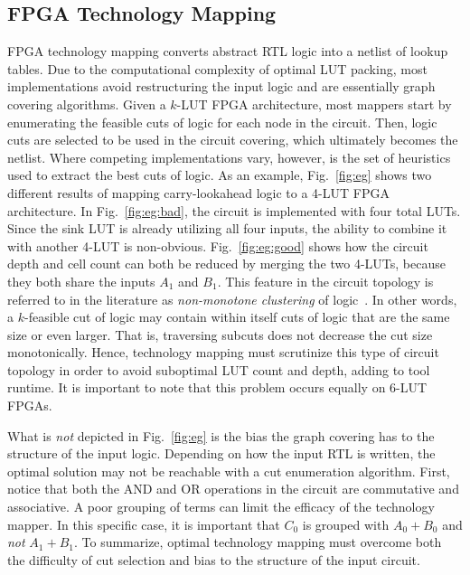 \subsection{FPGA Technology Mapping}\label{sec:background:fpga}
FPGA technology mapping converts abstract RTL logic into a netlist of lookup
tables. Due to the computational complexity of optimal LUT packing, most
implementations avoid restructuring the input logic and are essentially graph
covering algorithms. Given a $k$-LUT FPGA architecture, most mappers start by
enumerating the feasible cuts of logic for each node in the circuit. Then,
logic cuts are selected to be used in the circuit covering, which ultimately
becomes the netlist. Where competing implementations vary, however, is the set
of heuristics used to extract the best cuts of logic. As an example,
Fig.~\ref{fig:eg} shows two different results of mapping carry-lookahead logic
to a 4-LUT FPGA architecture. In Fig.~\ref{fig:eg:bad}, the circuit is
implemented with four total LUTs. Since the sink LUT is already utilizing all
four inputs, the ability to combine it with another 4-LUT is non-obvious.
Fig.~\ref{fig:eg:good} shows how the circuit depth and cell count can both be
reduced by merging the two 4-LUTs, because they both share the inputs $A_1$ and
$B_1$. This feature in the circuit topology is referred to in the literature as
\textit{non-monotone clustering} of logic~\cite{flowmap}. In other words, a
$k$-feasible cut of logic may contain within itself cuts of logic that are the
same size or even larger. That is, traversing subcuts does not decrease the cut
size monotonically. Hence, technology mapping must scrutinize this type of
circuit topology in order to avoid suboptimal LUT count and depth, adding to
tool runtime. It is important to note that this problem occurs equally on 6-LUT
FPGAs.

What is \textit{not} depicted in Fig.~\ref{fig:eg} is the bias the graph
covering has to the structure of the input logic. Depending on how the input
RTL is written, the optimal solution may not be reachable with a cut
enumeration algorithm. First, notice that both the AND and OR operations in the
circuit are commutative and associative. A poor grouping of terms can limit the
efficacy of the technology mapper. In this specific case, it is important that
$C_0$ is grouped with $A_0 + B_0$ and \textit{not} $A_1 + B_1$. To summarize,
optimal technology mapping must overcome both the difficulty of cut selection
and bias to the structure of the input circuit.

